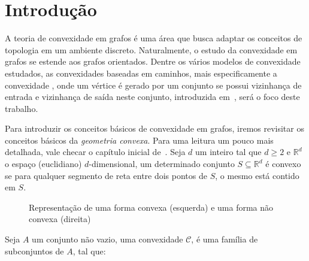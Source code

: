 \chapter{Introdução}

A teoria de convexidade em grafos é uma área que busca adaptar os conceitos de topologia em um ambiente discreto. Naturalmente, o estudo da convexidade em grafos se estende aos grafos orientados. Dentre os vários modelos de convexidade estudados, as convexidades baseadas em caminhos, mais especificamente a convexidade \pd, onde um vértice é gerado por um conjunto se possui vizinhança de entrada e vizinhança de saída neste conjunto, introduzida em~\cite{ERDOS1972}, será o foco deste trabalho.

Para introduzir os conceitos básicos de convexidade em grafos, iremos revisitar os conceitos básicos da \emph{geometria convexa}. Para uma leitura um pouco mais detalhada, vale checar o capítulo inicial de~\cite{julio}. Seja $d$ um inteiro tal que $d \geq 2$ e $\mathbb{R}^d$ o espaço (euclidiano) $d$-dimensional, um determinado conjunto $S \subseteq \mathbb{R}^d$ é convexo se para qualquer segmento de reta entre dois pontos de $S$, o mesmo está contido em $S$.

\begin{figure}[ht]
    \centering
\caption{Representação de uma forma convexa (esquerda) e uma forma não convexa (direita)}
\end{figure}

Seja $A$ um conjunto não vazio, uma convexidade $\mathcal{C}$, é uma família de subconjuntos de $A$, tal que:

